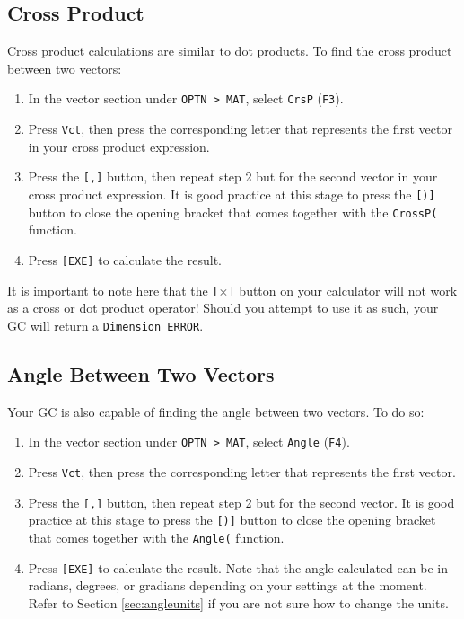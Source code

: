\documentclass[a5paper]{memoir}
\def\code#1{\texttt{#1}}
\def\fthree{(\code{F3})}
\def\ffour{(\code{F4})}
\begin{document}
\subsection{Cross Product}

Cross product calculations are similar to dot products. To find the cross product between two vectors:

\begin{enumerate}
	\item In the vector section under \code{OPTN > MAT}, select \code{CrsP} \fthree.
	\item Press \code{Vct}, then press the corresponding letter that represents the first vector in your cross product expression.
	\item Press the \code{[,]} button, then repeat step 2 but for the second vector in your cross product expression. It is good practice at this stage to press the \code{[)]} button to close the opening bracket that comes together with the \code{CrossP(} function.
	\item Press \code{[EXE]} to calculate the result.
\end{enumerate}

It is important to note here that the \code{[$\times$]} button on your calculator will not work as a cross or dot product operator! Should you attempt to use it as such, your GC will return a \code{Dimension ERROR}.

\subsection{Angle Between Two Vectors}

Your GC is also capable of finding the angle between two vectors. To do so:

\begin{enumerate}
	\item In the vector section under \code{OPTN > MAT}, select \code{Angle} \ffour.
	\item Press \code{Vct}, then press the corresponding letter that represents the first vector.
	\item Press the \code{[,]} button, then repeat step 2 but for the second vector. It is good practice at this stage to press the \code{[)]} button to close the opening bracket that comes together with the \code{Angle(} function.
	\item Press \code{[EXE]} to calculate the result. Note that the angle calculated can be in radians, degrees, or gradians depending on your settings at the moment. Refer to Section \ref{sec:angleunits} if you are not sure how to change the units.
\end{enumerate}
\end{document}
